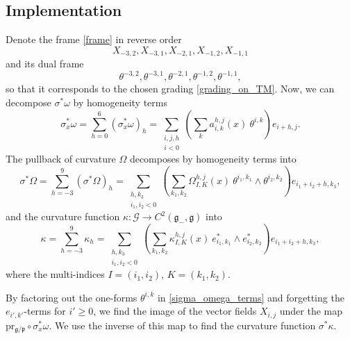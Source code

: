 \documentclass{amsart}
\theoremstyle{plain}
\theoremstyle{definition}
\theoremstyle{remark}
\newcommand{\mc}[1]{\mathcal{#1}}
\newcommand{\mfk}[1]{\mathfrak{#1}}
\begin{document}
\subsection{Implementation}
Denote the frame \eqref{frame} in reverse order
\begin{equation} \label{pullback_frame}
    X_{-3,2}, X_{-3,1}, X_{-2,1}, X_{-1,2}, X_{-1,1}
\end{equation}
and its dual frame
\begin{equation} \label{pullback_coframe}
    \theta^{-3,2}, \theta^{-3,1}, \theta^{-2,1}, \theta^{-1,2}, \theta^{-1,1},
\end{equation}
so that it corresponds to the chosen grading \eqref{grading_on_TM}. Now, we can decompose $\sigma^*\omega$ by homogeneity terms
\begin{equation} \label{sigma_omega_terms}
    \sigma_x^*\omega = \sum_{h=0}^6 (\sigma_x^*\omega)_h = \sum_{\substack{i,j,h \\ i<0}} \left( \sum_k a_{i,k}^{h,j} (x)\ \theta^{i,k} \right) e_{i+h,j}.
\end{equation}
The pullback of curvature $\Omega$ decomposes by homogeneity terms into
\begin{equation}
    \sigma^*\Omega = \sum_{h=-3}^9 (\sigma^*\Omega)_h = \sum_{\substack{h,k_3 \\ i_1,i_2<0}} \left( \sum_{k_1,k_2} \Omega_{I,K}^{h,j} (x)\ \theta^{i_1,k_1} \wedge \theta^{i_2,k_2} \right) e_{i_1+i_2+h,k_3},
\end{equation}
and the curvature function $\kappa\colon \mc{G} \to C^2(\mfk{g}_-, \mfk{g})$ into
\begin{equation}
    \kappa = \sum_{h=-3}^9 \kappa_h = \sum_{\substack{h,k_3 \\ i_1,i_2<0}} \left( \sum_{k_1,k_2} \kappa_{I,K}^{h,j} (x)\ e^*_{i_1,k_1} \wedge e^*_{i_2,k_2} \right) e_{i_1+i_2+h,k_3},
\end{equation}
where the multi-indices $I=(i_1,i_2)$, $K=(k_1,k_2)$.

By factoring out the one-forms $\theta^{i,k}$ in \eqref{sigma_omega_terms} and forgetting the $e_{i',k'}$-terms for $i'\geq0$, we find the image of the vector fields $X_{i,j}$ under the map $\mathrm{pr_{\mfk{g}/\mfk{p}}} \circ\sigma_x^*\omega$. We use the inverse of this map to find the curvature function $\sigma^*\kappa$.
\end{document}
